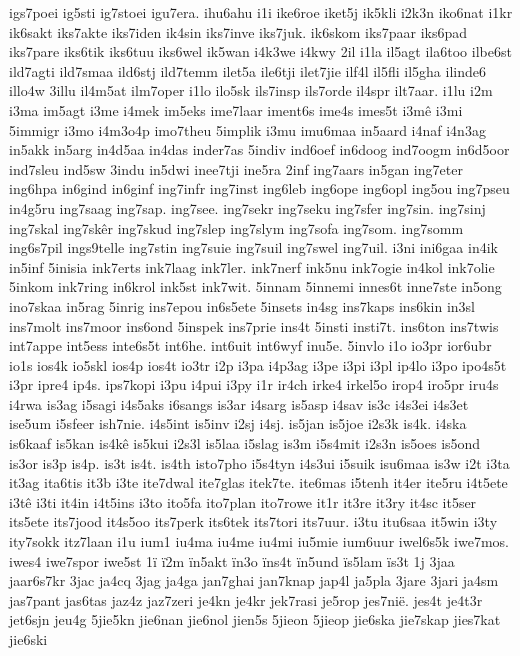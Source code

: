 {igs7poei
ig5sti
ig7stoei
igu7era.
ihu6ahu
i1i
ike6roe
iket5j
ik5kli
i2k3n
iko6nat
i1kr
ik6sakt
iks7akte
iks7iden
ik4sin
iks7inve
iks7juk.
ik6skom
iks7paar
iks6pad
iks7pare
iks6tik
iks6tuu
iks6wel
ik5wan
i4k3we
i4kwy
2il
i1la
il5agt
ila6too
ilbe6st
ild7agti
ild7smaa
ild6stj
ild7temm
ilet5a
ile6tji
ilet7jie
ilf4l
il5fli
il5gha
ilinde6
illo4w
3illu
il4m5at
ilm7oper
i1lo
ilo5sk
ils7insp
ils7orde
il4spr
ilt7aar.
i1lu
i2m
i3ma
im5agt
i3me
i4mek
im5eks
ime7laar
iment6s
ime4s
imes5t
i3mê
i3mi
5immigr
i3mo
i4m3o4p
imo7theu
5implik
i3mu
imu6maa
in5aard
i4naf
i4n3ag
in5akk
in5arg
in4d5aa
in4das
inder7as
5indiv
ind6oef
in6doog
ind7oogm
in6d5oor
ind7sleu
ind5sw
3indu
in5dwi
inee7tji
ine5ra
2inf
ing7aars
in5gan
ing7eter
ing6hpa
in6gind
in6ginf
ing7infr
ing7inst
ing6leb
ing6ope
ing6opl
ing5ou
ing7pseu
in4g5ru
ing7saag
ing7sap.
ing7see.
ing7sekr
ing7seku
ing7sfer
ing7sin.
ing7sinj
ing7skal
ing7skêr
ing7skud
ing7slep
ing7slym
ing7sofa
ing7som.
ing7somm
ing6s7pil
ings9telle
ing7stin
ing7suie
ing7suil
ing7swel
ing7uil.
i3ni
ini6gaa
in4ik
in5inf
5inisia
ink7erts
ink7laag
ink7ler.
ink7nerf
ink5nu
ink7ogie
in4kol
ink7olie
5inkom
ink7ring
in6krol
ink5st
ink7wit.
5innam
5innemi
innes6t
inne7ste
in5ong
ino7skaa
in5rag
5inrig
ins7epou
in6s5ete
5insets
in4sg
ins7kaps
ins6kin
in3sl
ins7molt
ins7moor
ins6ond
5inspek
ins7prie
ins4t
5insti
insti7t.
ins6ton
ins7twis
int7appe
int5ess
inte6s5t
int6he.
int6uit
int6wyf
inu5e.
5invlo
i1o
io3pr
ior6ubr
io1s
ios4k
io5skl
ios4p
ios4t
io3tr
i2p
i3pa
i4p3ag
i3pe
i3pi
i3pl
ip4lo
i3po
ipo4s5t
i3pr
ipre4
ip4s.
ips7kopi
i3pu
i4pui
i3py
i1r
ir4ch
irke4
irkel5o
irop4
iro5pr
iru4s
i4rwa
is3ag
i5sagi
i4s5aks
i6sangs
is3ar
i4sarg
is5asp
i4sav
is3c
i4s3ei
i4s3et
ise5um
i5sfeer
ish7nie.
i4s5int
is5inv
i2sj
i4sj.
is5jan
is5joe
i2s3k
is4k.
i4ska
is6kaaf
is5kan
is4kê
is5kui
i2s3l
is5laa
i5slag
is3m
i5s4mit
i2s3n
is5oes
is5ond
is3or
is3p
is4p.
is3t
is4t.
is4th
isto7pho
i5s4tyn
i4s3ui
i5suik
isu6maa
is3w
i2t
i3ta
it3ag
ita6tis
it3b
i3te
ite7dwal
ite7glas
itek7te.
ite6mas
i5tenh
it4er
ite5ru
i4t5ete
i3tê
i3ti
it4in
i4t5ins
i3to
ito5fa
ito7plan
ito7rowe
it1r
it3re
it3ry
it4sc
it5ser
its5ete
its7jood
it4s5oo
its7perk
its6tek
its7tori
its7uur.
i3tu
itu6saa
it5win
i3ty
ity7sokk
itz7laan
i1u
ium1
iu4ma
iu4me
iu4mi
iu5mie
ium6uur
iwel6s5k
iwe7mos.
iwes4
iwe7spor
iwe5st
1ï
ï2m
ïn5akt
ïn3o
ïns4t
ïn5und
ïs5lam
ïs3t
1j
3jaa
jaar6s7kr
3jac
ja4cq
3jag
ja4ga
jan7ghai
jan7knap
jap4l
ja5pla
3jare
3jari
ja4sm
jas7pant
jas6tas
jaz4z
jaz7zeri
je4kn
je4kr
jek7rasi
je5rop
jes7nië.
jes4t
je4t3r
jet6sjn
jeu4g
5jie5kn
jie6nan
jie6nol
jien5s
5jieon
5jieop
jie6ska
jie7skap
jies7kat
jie6ski
}
